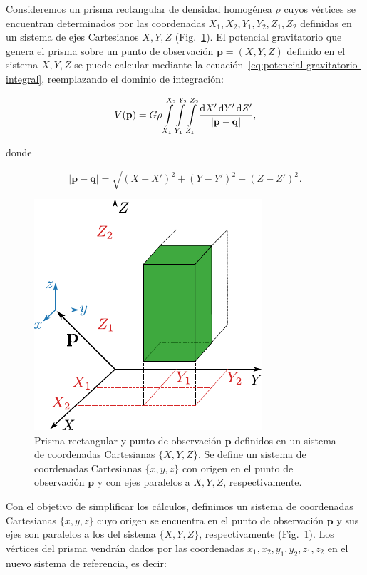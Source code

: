 Consideremos un prisma rectangular de densidad homogénea $\rho$ cuyos vértices
se encuentran determinados por las coordenadas $X_1, X_2, Y_1, Y_2, Z_1, Z_2$
definidas en un sistema de ejes Cartesianos ${X, Y, Z}$
(Fig.~\ref{fig:rectangular-prism}).
El potencial gravitatorio que genera el prisma sobre un punto de observación
$\mathbf{p} = (X, Y, Z)$ definido en el sistema ${X, Y, Z}$ se puede
calcular mediante la ecuación~\ref{eq:potencial-gravitatorio-integral},
reemplazando el dominio de integración:

\begin{equation}
    V(\mathbf{p}) =
    G \rho
    \int\limits_{X_1}^{X_2}
    \int\limits_{Y_1}^{Y_2}
    \int\limits_{Z_1}^{Z_2}
    \frac{\mathop{}\!\textnormal{d} X' \mathop{}\!\textnormal{d} Y' \mathop{}\!\textnormal{d} Z'}{|\mathbf{p} - \mathbf{q}|},
\end{equation}

\noindent donde

\begin{equation}
    |\mathbf{p} - \mathbf{q}| = \sqrt{
        (X - X')^2 + (Y - Y')^2 + (Z - Z')^2
    }.
\end{equation}

\begin{figure}[t]
    \centering
    \includegraphics[width=0.6\linewidth]{figs/rectangular-prism.pdf}
    \caption{
        Prisma rectangular y punto de observación $\mathbf{p}$ definidos en un
        sistema de coordenadas Cartesianas $\{X, Y, Z\}$. Se define un sistema
        de coordenadas Cartesianas $\{x, y, z\}$ con origen en el punto de
        observación $\mathbf{p}$ y con ejes paralelos a $X, Y, Z$,
        respectivamente.
    }
    \label{fig:rectangular-prism}
\end{figure}

Con el objetivo de simplificar los cálculos, definimos un sistema de
coordenadas Cartesianas $\{x, y, z\}$ cuyo origen se encuentra en el punto de
observación $\mathbf{p}$ y sus ejes son paralelos a los del sistema $\{X, Y,
Z\}$, respectivamente (Fig.~\ref{fig:rectangular-prism}).
Los vértices del prisma vendrán dados por las coordenadas
$x_1, x_2, y_1, y_2, z_1, z_2$ en el nuevo sistema de referencia, es decir:

